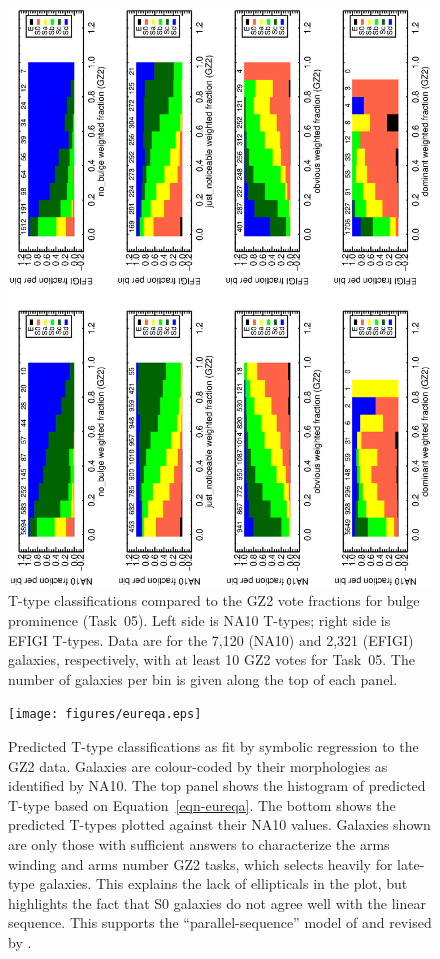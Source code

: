 \documentclass[useAMS,usenatbib]{mn2e}
\begin{document}
\begin{figure}
\includegraphics[angle=-90,width=7.0in]{figures/bulgeprominence_color.ps}
\caption{T-type classifications compared to the GZ2 vote fractions for bulge prominence (Task~05). Left side is NA10 T-types; right side is EFIGI T-types. Data are for the 7,120 (NA10) and 2,321 (EFIGI) galaxies, respectively, with at least 10 GZ2 votes for Task~05. The number of galaxies per bin is given along the top of each panel. 
\label{fig-bulgeprominence}}
\end{figure}

\begin{figure}
\texttt{[image: figures/eureqa.eps]}
\caption{Predicted T-type classifications as fit by symbolic regression to the GZ2 data. Galaxies are colour-coded by their morphologies as identified by NA10. The top panel shows the histogram of predicted T-type based on Equation~\ref{eqn-eureqa}. The bottom shows the predicted T-types plotted against their NA10 values. Galaxies shown are only those with sufficient answers to characterize the arms winding and arms number GZ2 tasks, which selects heavily for late-type galaxies. This explains the lack of ellipticals in the plot, but highlights the fact that S0 galaxies do not agree well with the linear sequence. This supports the ``parallel-sequence'' model of \citet{van76} and revised by \citet{kor12}. 
\label{fig-eureqa}}
\end{figure}
\end{document}
